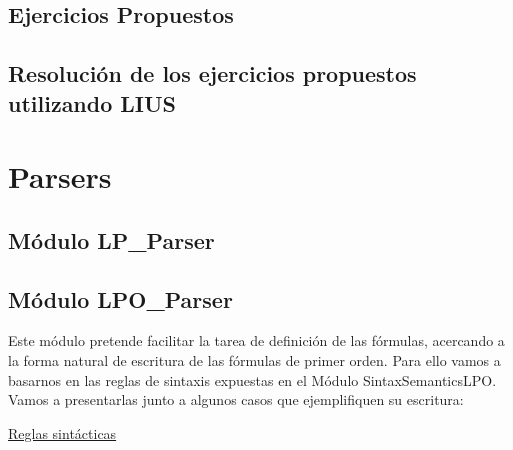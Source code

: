 \documentclass[a4paper]{report}
\begin{document}
\section{Ejercicios Propuestos}
\toDo

\section{Resolución de los ejercicios propuestos utilizando LIUS}
\label{sec:2.7}

\toDo

\appendix
\clearpage
\addappheadtotoc
\appendixpage
\chapter{Parsers}
\newpage
\section{Módulo LP\_Parser}
\label{sec:A1.LPParser}

\toDo

\newpage
\section{Módulo LPO\_Parser}
\label{sec:A2.LPOParser}

Este módulo pretende facilitar la tarea de definición de las fórmulas, acercando a la forma natural de escritura de las fórmulas de primer orden. Para ello vamos a basarnos en las reglas de sintaxis expuestas en el Módulo SintaxSemanticsLPO. Vamos a presentarlas junto a algunos casos que ejemplifiquen su escritura:

\noindent \underline{Reglas sintácticas}
\end{document}
